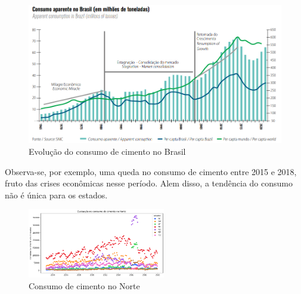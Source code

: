 \begin{figure}[H] 
    \includegraphics[width= 14cm]{../figuras/evolucao-consumo.png}
    \caption{Evolução do consumo de cimento no Brasil \cite{relatorio-snic}}
    \label{fig:evolucao-consumo-cimento}
\end{figure}

Observa-se, por exemplo, uma queda no consumo de cimento entre 2015 e 2018,
fruto das crises econômicas nesse período.
Alem disso, a tendência do consumo não é única para os estados. 

\begin{figure}[H]
    \centering
    \includegraphics[width=6cm]{../figuras/evolucao-consumo-norte.png}
    \caption{Consumo de cimento no Norte}
\end{figure}


    


